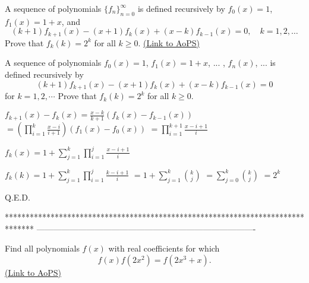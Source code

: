 \begin{problem}
	A sequence of polynomials $\{f_n\}_{n=0}^{\infty}$ is defined recursively by $f_0(x)=1$, $f_1(x)=1+x$, and
\[(k+1)f_{k+1}(x)-(x+1)f_k(x)+(x-k)f_{k-1}(x)=0, \quad k=1,2,\ldots\]
Prove that $f_k(k)=2^k$ for all $k\geq 0$.
	\flushright \href{https://artofproblemsolving.com/community/c6h366417}{(Link to AoPS)}
\end{problem}



\begin{solution}
	\begin{tcolorbox}A sequence of polynomials $f_0(x)=1$, $f_1(x)=1+x$, ... , $f_n(x)$, ... is defined recursively by
\[(k+1)f_{k+1}(x)-(x+1)f_k(x)+(x-k)f_{k-1}(x)=0\]
for $k=1,2,\cdots$
Prove that $f_k(k)=2^k$ for all $k\geq 0$.\end{tcolorbox}
$f_{k+1}(x)-f_k(x)=\frac{x-k}{k+1}(f_k(x)-f_{k-1}(x))$ $=\left(\prod_{i=1}^k\frac{x-i}{i+1}\right)(f_1(x)-f_0(x))$ $=\prod_{i=1}^{k+1}\frac{x-i+1}{i}$

$f_{k}(x)=1+\sum_{j=1}^{k}\prod_{i=1}^{j}\frac{x-i+1}{i}$

$f_k(k)=1+\sum_{j=1}^{k}\prod_{i=1}^{j}\frac{k-i+1}{i}$ $=1+\sum_{j=1}^{k}\binom kj$ $=\sum_{j=0}^{k}\binom kj$ $=2^k$

Q.E.D.
\end{solution}
*******************************************************************************
-------------------------------------------------------------------------------

\begin{problem}
	Find all polynomials $f(x)$ with real coefficients for which
\[f(x)f(2x^2) = f(2x^3 + x).\]
	\flushright \href{https://artofproblemsolving.com/community/c6h366966}{(Link to AoPS)}
\end{problem}




